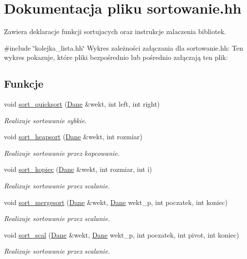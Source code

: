 \hypertarget{sortowanie_8hh}{\section{\-Dokumentacja pliku sortowanie.\-hh}
\label{sortowanie_8hh}
}


\-Zawiera deklaracje funkcji sortujacych oraz instrukcje zalaczenia bibliotek.  


{\ttfamily \#include \char`\"{}kolejka\-\_\-lista.\-hh\char`\"{}}\*
\-Wykres zależności załączania dla sortowanie.\-hh\-:
\-Ten wykres pokazuje, które pliki bezpośrednio lub pośrednio załączają ten plik\-:
\subsection*{\-Funkcje}
\begin{DoxyCompactItemize}
\item 
void \hyperlink{sortowanie_8hh_af2d29a44df2d1914771a907db2a9cedc}{sort\-\_\-quicksort} (\hyperlink{class_dane}{\-Dane} \&wekt, int left, int right)
\begin{DoxyCompactList}\small\item\em \-Realizuje sortowanie sybkie. \end{DoxyCompactList}\item 
void \hyperlink{sortowanie_8hh_aa02edb4bae79f21b06cc8b32e102e42c}{sort\-\_\-heapsort} (\hyperlink{class_dane}{\-Dane} \&wekt, int rozmiar)
\begin{DoxyCompactList}\small\item\em \-Realizuje sortowanie przez kopcowanie. \end{DoxyCompactList}\item 
void \hyperlink{sortowanie_8hh_aecf7222db9a72738cf5ccc3fd1bec85e}{sort\-\_\-kopiec} (\hyperlink{class_dane}{\-Dane} \&wekt, int rozmiar, int i)
\begin{DoxyCompactList}\small\item\em \-Realizuje sortowanie przez scalanie. \end{DoxyCompactList}\item 
void \hyperlink{sortowanie_8hh_acc216f68e14106ff40811124b2d0d4bb}{sort\-\_\-mergesort} (\hyperlink{class_dane}{\-Dane} \&wekt, \hyperlink{class_dane}{\-Dane} wekt\-\_\-p, int poczatek, int koniec)
\begin{DoxyCompactList}\small\item\em \-Realizuje sortowanie przez scalanie. \end{DoxyCompactList}\item 
void \hyperlink{sortowanie_8hh_aadf7f7b96e83a6d27c2e620f667e9609}{sort\-\_\-scal} (\hyperlink{class_dane}{\-Dane} \&wekt, \hyperlink{class_dane}{\-Dane} wekt\-\_\-p, int poczatek, int pivot, int koniec)
\begin{DoxyCompactList}\small\item\em \-Realizuje sortowanie przez scalanie. \end{DoxyCompactList}\end{DoxyCompactItemize}



